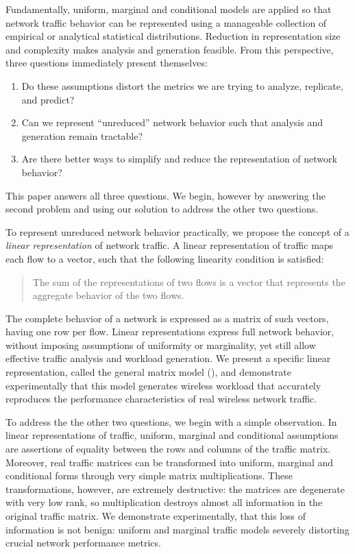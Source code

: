 \documentclass[twocolumn,final]{svjour3}
\newcommand{\caps}[1]{{\smaller{#1}}}
\newcommand{\newfootnote}[2]{\newcommand{#1}{\footnote{#2} }}
\begin{document}
Fundamentally, uniform, marginal and conditional models are applied so that network traffic behavior can be represented using a manageable collection of empirical or analytical statistical distributions.
Reduction in representation size and complexity makes analysis and generation feasible.
From this perspective, three questions immediately present themselves:
\begin{enumerate}
\item Do these assumptions distort the metrics we are trying to analyze, replicate, and predict?
\item Can we represent ``unreduced'' network behavior such that analysis and generation remain tractable?
\item Are there better ways to simplify and reduce the representation of network behavior?
\end{enumerate}
This paper answers all three questions. We begin, however by answering the second problem and  
using our solution to address the other two questions.

To represent unreduced network behavior practically, we propose the concept of a \emph{linear representation} of network traffic.
A linear representation of traffic maps each flow to a vector, such that the following linearity condition is satisfied:
\begin{quote}
The sum of the representations of two flows is a vector that represents the aggregate behavior of the two flows.
\end{quote}
The complete behavior of a network is expressed as a matrix of such vectors, having one row per flow.
Linear representations express full network behavior, without imposing assumptions of uniformity or marginality, yet still allow effective traffic analysis and workload generation.
We present a specific linear representation, called the general matrix model (\caps{GMM}), and demonstrate experimentally that this model generates wireless workload that accurately reproduces the performance characteristics of real wireless network traffic.

\newfootnote{\ranknote}{For uniform and marginal assumptions, the multiplication matrix has rank 1  since all rows and columns are identical. In the conditional case, the rank of the matrix is the number of conditioning classes.}

To address the the other two questions, we begin with a simple observation.
In linear representations of traffic, uniform, marginal and conditional assumptions are assertions of equality between the rows and columns of the traffic matrix.
Moreover, real traffic matrices can be transformed into uniform, marginal and conditional forms through very simple matrix multiplications.
These transformations, however, are extremely destructive: the matrices are degenerate with very low rank, so multiplication destroys almost all information in the original traffic matrix.
We demonstrate experimentally, that this loss of information is not benign:
uniform and marginal traffic models severely distorting crucial network performance metrics.
\end{document}
